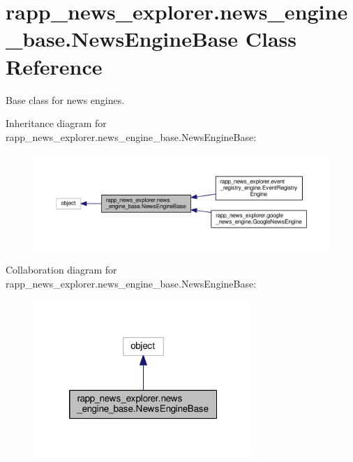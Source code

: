 \hypertarget{classrapp__news__explorer_1_1news__engine__base_1_1NewsEngineBase}{\section{rapp\-\_\-news\-\_\-explorer.\-news\-\_\-engine\-\_\-base.\-News\-Engine\-Base Class Reference}
\label{classrapp__news__explorer_1_1news__engine__base_1_1NewsEngineBase}
}


Base class for news engines.  




Inheritance diagram for rapp\-\_\-news\-\_\-explorer.\-news\-\_\-engine\-\_\-base.\-News\-Engine\-Base\-:
\nopagebreak
\begin{figure}[H]
\begin{center}
\leavevmode
\includegraphics[width=350pt]{classrapp__news__explorer_1_1news__engine__base_1_1NewsEngineBase__inherit__graph}
\end{center}
\end{figure}


Collaboration diagram for rapp\-\_\-news\-\_\-explorer.\-news\-\_\-engine\-\_\-base.\-News\-Engine\-Base\-:
\nopagebreak
\begin{figure}[H]
\begin{center}
\leavevmode
\includegraphics[width=236pt]{classrapp__news__explorer_1_1news__engine__base_1_1NewsEngineBase__coll__graph}
\end{center}
\end{figure}
